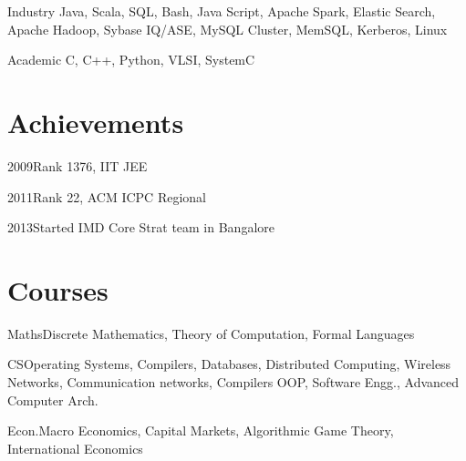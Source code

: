 \documentclass{tccv}
\begin{document}
\begin{factlist}

\item{Industry}
     {Java, Scala, SQL, Bash, Java Script, Apache Spark, Elastic Search, Apache Hadoop, Sybase IQ/ASE,  MySQL Cluster, MemSQL, Kerberos, Linux}

\item{Academic}
     {C, C++, Python, VLSI, SystemC}

\end{factlist}

\section{Achievements}

\begin{factlist}
\item{2009}{Rank 1376, IIT JEE}
\item{2011}{Rank 22, ACM ICPC Regional}
\item{2013}{Started IMD Core Strat team in Bangalore}
\end{factlist}


\section{Courses}

\begin{factlist}
\item{Maths}{Discrete Mathematics, Theory of Computation, Formal Languages}
\item{CS}{Operating Systems, Compilers, Databases, Distributed Computing, Wireless Networks, Communication networks, Compilers OOP, Software Engg., Advanced Computer Arch.}
\item{Econ.}{Macro Economics, Capital Markets, Algorithmic Game Theory, International Economics}
\end{factlist}
\end{document}
